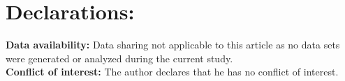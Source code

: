 \documentclass[a4paper,12pt]{amsart}
\theoremstyle{definition}
\begin{document}
	
	
	
	\section*{Declarations:}
	
	
	\noindent\textbf{Data availability:}
	Data sharing not applicable to this article as no data sets were generated or analyzed during the current study.\\
	
	
	
	
	

	
	\noindent\textbf{Conflict of interest:} The author declares that he has no conflict of interest.
	
\end{document}
